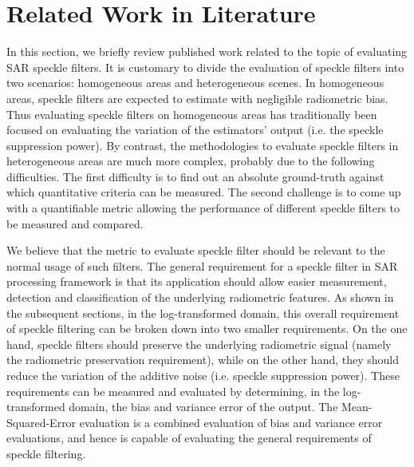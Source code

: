 \documentclass[journal]{IEEEtran}
\begin{document}
\section{Related Work in Literature}
\label{sec:lit_review}

In this section, we briefly review published work 
	related to the topic of evaluating SAR speckle filters.	
It is customary to divide the evaluation of speckle filters into two scenarios:
	homogeneous areas and heterogeneous scenes.
In homogeneous areas,
	speckle filters are expected to estimate with negligible radiometric bias.
Thus evaluating speckle filters on homogeneous areas has traditionally been focused on evaluating the variation of the estimators' output (i.e. the speckle suppression power).
By contrast, the methodologies to evaluate speckle filters in heterogeneous areas are much more complex, probably due to the following difficulties.
The first difficulty is to find out an absolute ground-truth against which quantitative criteria can be measured.
The second challenge is to come up with a quantifiable metric allowing the performance of different speckle filters to be measured and compared.

We believe that the metric to evaluate speckle filter should be relevant to the normal usage of such filters.
The general requirement for a speckle filter in SAR processing framework is that its application should allow easier measurement, detection and classification of the underlying radiometric features.
As shown in the subsequent sections, in the log-transformed domain, 
	this overall requirement of speckle filtering can be broken down into two smaller requirements.
On the one hand, speckle filters should preserve the underlying radiometric signal (namely the radiometric preservation requirement), while on the other hand, they should reduce the variation of the additive noise (i.e. speckle suppression power).
These requirements can be measured and evaluated by determining, in the log-transformed domain, the bias and variance error of the output.
The Mean-Squared-Error evaluation is a combined evaluation of bias and variance error evaluations, and hence is capable of evaluating the general requirements of speckle filtering.
\end{document}
